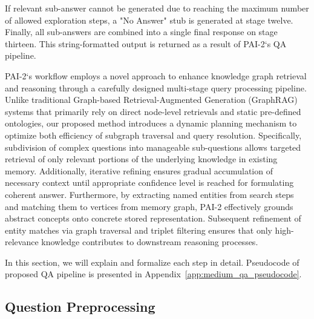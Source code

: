 If relevant sub-answer cannot be generated due to reaching the maximum number of allowed exploration steps, a "No Answer" stub is generated at stage twelve. Finally, all sub-answers are combined into a single final response on stage thirteen. This string-formatted output is returned as a result of PAI-2`s QA pipeline.

PAI-2`s workflow employs a novel approach to enhance knowledge graph retrieval and reasoning through a carefully designed multi-stage query processing pipeline. Unlike traditional Graph-based Retrieval-Augmented Generation (GraphRAG) systems that primarily rely on direct node-level retrievals and static pre-defined ontologies, our proposed method introduces a dynamic planning mechanism to optimize both efficiency of subgraph traversal and query resolution. Specifically, subdivision of complex questions into manageable sub-questions allows targeted retrieval of only relevant portions of the underlying knowledge in existing memory. Additionally, iterative refining ensures gradual accumulation of necessary context until appropriate confidence level is reached for formulating coherent answer. Furthermore, by extracting named entities from search steps and matching them to vertices from memory graph, PAI-2 effectively grounds abstract concepts onto concrete stored representation. Subsequent refinement of entity matches via graph traversal and triplet filtering ensures that only high-relevance knowledge contributes to downstream reasoning processes.

In this section, we will explain and formalize each step in detail. Pseudocode of proposed QA pipeline is presented in Appendix~\ref{app:medium_qa_pseudocode}.

\subsection{Question Preprocessing}

